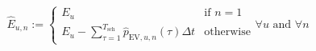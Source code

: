 \begin{equation}
	\hat{E}_{u,n} :=
	\begin{cases}
		E_u &\text{if } n=1\\
		E_u - \sum_{\tau=1}^{T_\text{sch}} \hat{p}_{\text{EV},u,n}(\tau)\Delta t &\text{otherwise}
	\end{cases}
	\forall u \text{ and } \forall n
	\label{ch3:equ:temporary-charging-demand-expanded}
\end{equation}